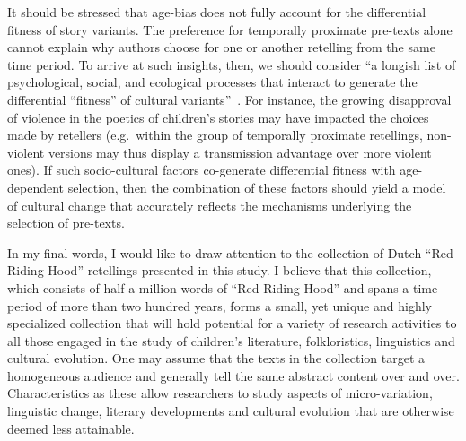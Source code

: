 It should be stressed that age-bias does not fully account for the differential fitness of story variants. The preference for temporally proximate pre-texts alone cannot explain why authors choose for one or another retelling from the same time period. To arrive at such insights, then, we should consider ``a longish list of psychological, social, and ecological processes that interact to generate the differential ``fitness'' of cultural variants''~\autocite{Henrich:2008}. For instance, the growing disapproval of violence in the poetics of children's stories may have impacted the choices made by retellers (e.g.\ within the group of temporally proximate retellings, non-violent versions may thus display a transmission advantage over more violent ones). If such socio-cultural factors co-generate differential fitness with age-dependent selection, then the combination of these factors should yield a model of cultural change that accurately reflects the mechanisms underlying the selection of pre-texts.

In my final words, I would like to draw attention to the collection of Dutch ``Red Riding Hood'' retellings presented in this study. I believe that this collection, which consists of half a million words of ``Red Riding Hood'' and spans a time period of more than two hundred years, forms a small, yet unique and highly specialized collection that will hold potential for a variety of research activities to all those engaged in the study of children's literature, folkloristics, linguistics and cultural evolution. One may assume that the texts in the collection target a homogeneous audience and generally tell the same abstract content over and over. Characteristics as these allow researchers to study aspects of micro-variation, linguistic change, literary developments and cultural evolution that are otherwise deemed less attainable.